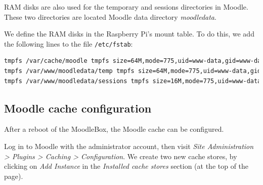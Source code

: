 \documentclass[12pt]{article}
\begin{document}
RAM disks are also used for the temporary and sessions directories in Moodle.
These two directories are located Moodle data directory \emph{moodledata}.

We define the RAM disks in the Raspberry Pi's mount table.
To do this, we add the following lines to the file \lstinline{/etc/fstab}:
\begin{lstlisting}[language=bash]
tmpfs /var/cache/moodle tmpfs size=64M,mode=775,uid=www-data,gid=www-data 0 0
tmpfs /var/www/moodledata/temp tmpfs size=64M,mode=775,uid=www-data,gid=www-data 0 0
tmpfs /var/www/moodledata/sessions tmpfs size=16M,mode=775,uid=www-data,gid=www-data 0 0
\end{lstlisting}

%
%

\subsection{Moodle cache configuration}\label{ssec-cache}

After a reboot of the MoodleBox, the Moodle cache can be configured.

Log in to Moodle with the administrator account, then visit \textsl{Site Administration > Plugins > Caching > Configuration}.
We create two new cache stores, by clicking on \emph{Add Instance} in the \emph{Installed cache stores} section (at the top of the page).
\end{document}

